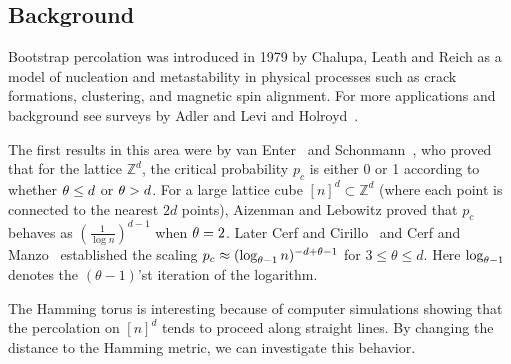 \subsection{Background}
Bootstrap percolation was introduced in 1979 by Chalupa, Leath and Reich \cite{bethe} as a model of nucleation and metastability in physical processes such as crack formations, clustering, and magnetic spin alignment.
For more applications and background see surveys by Adler and Levi \cite{brazil} and Holroyd~\cite{holroyd-survey}.

The first results in this area were by van Enter~\cite{vanenter} and Schonmann~\cite{schonmann}, who proved that for the lattice $\mathbb{Z}^d$, the critical probability $p_c$ is either 0 or 1 according to whether $\theta \le d$ or $\theta > d$. 
For a large lattice cube $[n]^d\subset \mathbb{Z}^d$ (where each point is connected to the nearest $2d$ points), Aizenman and Lebowitz \cite{aizenman} proved that $p_c$ behaves as $(\frac{1}{\log n})^{d-1}$ when $\theta=2$.
Later Cerf and Cirillo~\cite{cerfcirillo} and Cerf and Manzo~\cite{cerfmanzo} established the scaling $p_c \approx (\log_{\theta-1} n)^{-d+\theta-1}$ for $3\le \theta\le d$.
Here $\log_{\theta-1}$ denotes the $(\theta-1)$'st iteration of the logarithm. 

The Hamming torus is interesting because of computer simulations showing that the percolation on $[n]^d$ tends to proceed along straight lines.
By changing the distance to the Hamming metric, we can investigate this behavior.

